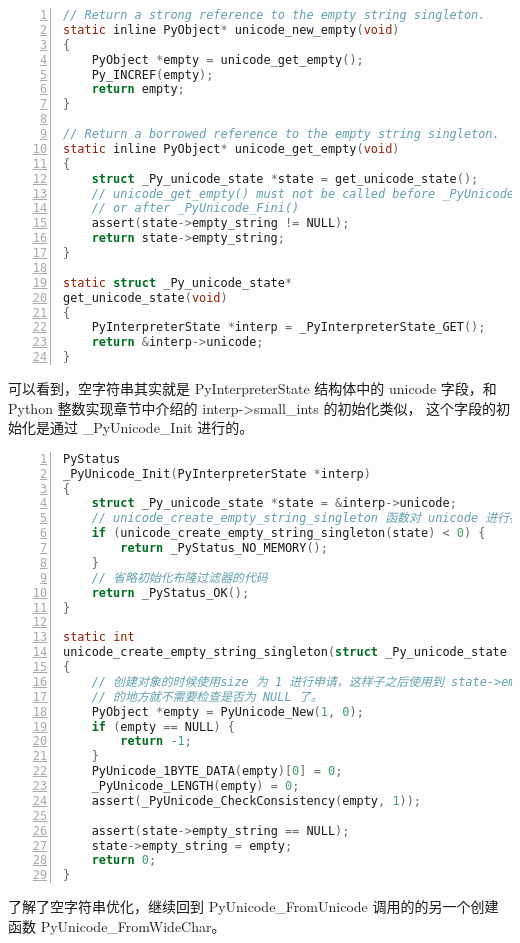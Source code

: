 \begin{lstlisting}[language=C, numbers=left, numbersep=1em, numberstyle=\footnotesize , breaklines=true]
// Return a strong reference to the empty string singleton.
static inline PyObject* unicode_new_empty(void)
{
    PyObject *empty = unicode_get_empty();
    Py_INCREF(empty);
    return empty;
}

// Return a borrowed reference to the empty string singleton.
static inline PyObject* unicode_get_empty(void)
{
    struct _Py_unicode_state *state = get_unicode_state();
    // unicode_get_empty() must not be called before _PyUnicode_Init()
    // or after _PyUnicode_Fini()
    assert(state->empty_string != NULL);
    return state->empty_string;
}

static struct _Py_unicode_state*
get_unicode_state(void)
{
    PyInterpreterState *interp = _PyInterpreterState_GET();
    return &interp->unicode;
}
\end{lstlisting}

可以看到，空字符串其实就是 PyInterpreterState 结构体中的 unicode 字段，和Python 整数实现章节中介绍的 interp->small\_ints 的初始化类似，
这个字段的初始化是通过 \_PyUnicode\_Init 进行的。

\begin{lstlisting}[language=C, numbers=left, numbersep=1em, numberstyle=\footnotesize , breaklines=true]
PyStatus
_PyUnicode_Init(PyInterpreterState *interp)
{
    struct _Py_unicode_state *state = &interp->unicode;
    // unicode_create_empty_string_singleton 函数对 unicode 进行初始化
    if (unicode_create_empty_string_singleton(state) < 0) {
        return _PyStatus_NO_MEMORY();
    }
    // 省略初始化布隆过滤器的代码
    return _PyStatus_OK();
}

static int
unicode_create_empty_string_singleton(struct _Py_unicode_state *state)
{
    // 创建对象的时候使用size 为 1 进行申请，这样子之后使用到 state->empty_string
    // 的地方就不需要检查是否为 NULL 了。
    PyObject *empty = PyUnicode_New(1, 0);
    if (empty == NULL) {
        return -1;
    }
    PyUnicode_1BYTE_DATA(empty)[0] = 0;
    _PyUnicode_LENGTH(empty) = 0;
    assert(_PyUnicode_CheckConsistency(empty, 1));

    assert(state->empty_string == NULL);
    state->empty_string = empty;
    return 0;
}
\end{lstlisting}

了解了空字符串优化，继续回到 PyUnicode\_FromUnicode 调用的的另一个创建函数 PyUnicode\_FromWideChar。

